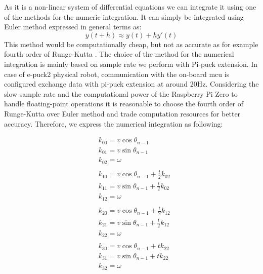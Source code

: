 As it is a non-linear system of differential equations we can integrate it using one of the methods for the numeric integration.
It can simply be integrated using Euler method expressed in general terms as:
\begin{equation}
    y(t + h) \approx y(t) + h y'(t)
\end{equation}
This method would be computationally cheap, but not as accurate as for example fourth order of Runge-Kutta \cite[p. 40]{noauthor_solving_1993}.
The choice of the method for the numerical integration is mainly based on sample rate we perform with Pi-puck extension.
In case of e-puck2 physical robot, communication with the on-board \ac{mcu} is configured exchange data with pi-puck extension at around 20Hz.
Considering the slow sample rate and the computational power of the Raspberry Pi Zero to handle floating-point operations it is reasonable to choose the fourth order of Runge-Kutta over Euler method and trade computation resources for better accuracy.
Therefore, we express the numerical integration as following:


\begin{equation}
\begin{aligned}
    & k_{00} = v \cos{\theta_{n-1}} \\
    & k_{01} = v \sin{\theta_{n-1}} \\
    & k_{02} = \omega \\
    & \\
    & k_{10} = v \cos{\theta_{n-1} + \frac{t}{2}k_{02}} \\
    & k_{11} = v \sin{\theta_{n-1} + \frac{t}{2}k_{02}} \\
    & k_{12} = \omega \\
    & \\
    & k_{20} = v \cos{\theta_{n-1} + \frac{t}{2}k_{12}} \\
    & k_{21} = v \sin{\theta_{n-1} + \frac{t}{2}k_{12}} \\
    & k_{22} = \omega \\
    & \\
    & k_{30} = v \cos{\theta_{n-1} + t k_{22}} \\
    & k_{31} = v \sin{\theta_{n-1} + t k_{22}} \\
    & k_{32} = \omega
\end{aligned}
\end{equation}

